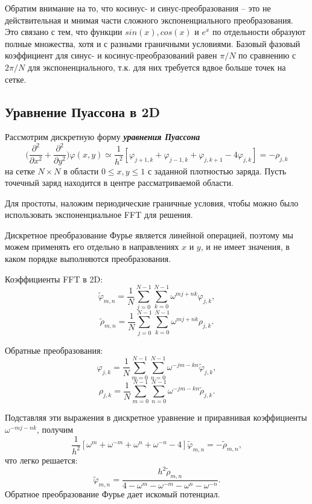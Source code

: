 \documentclass[a4paper,12pt]{article}
\theoremstyle{plain} %
\theoremstyle{definition} %
\theoremstyle{remark} %
\theoremstyle{definition}
\theoremstyle{definition}
\begin{document}
		Обратим внимание на то, что косинус- и синус-преобразования -- это не действительная и мнимая части сложного экспоненциального преобразования. Это связано с тем, что функции $sin(x), cos(x)$ и $e^{x}$ по отдельности образуют полные множества, хотя и с разными граничными условиями. Базовый фазовый коэффициент для синус- и косинус-преобразований равен $\pi/N$ по сравнению с $2\pi/N$ для экспоненциального, т.к. для них требуется вдвое больше точек на сетке.
		
	\subsection{Уравнение Пуассона в 2D}
		Рассмотрим дискретную форму \textrm{\textbf{\textit{уравнения Пуассона}}}
		$$\Big(\frac{\partial^{2}}{\partial x^{2}}+\frac{\partial^{2}}{\partial y^{2}}\Big)\varphi(x,y)\simeq\frac{1}{h^{2}}[\varphi_{j+1,k}+\varphi_{j-1,k}+\varphi_{j,k+1}-4\varphi_{j,k}]=-\rho_{j,k}$$
		на сетке $N\times N$ в области $0\le x,y\le 1$ с заданной плотностью заряда. Пусть точечный заряд находится в центре рассматриваемой области.
		\medskip
		
		Для простоты, наложим периодические граничные условия, чтобы можно было использовать экспоненциальное FFT для решения.
		\medskip
		
		Дискретное преобразование Фурье является линейной операцией, поэтому мы можем применять его отдельно в направлениях $x$ и $y$, и не имеет значения, в каком порядке выполняются преобразования.
		\medskip
		
		Коэффициенты FFT в 2D:
		$$\tilde{\varphi}_{m,n}=\frac{1}{N}\sum_{j=0}^{N-1}\sum_{k=0}^{N-1}\omega^{mj+nk}\varphi_{j,k},$$
		$$\tilde{\rho}_{m,n}=\frac{1}{N}\sum_{j=0}^{N-1}\sum_{k=0}^{N-1}\omega^{mj+nk}\rho_{j,k}.$$
		
		Обратные преобразования:
		$$\varphi_{j,k}=\frac{1}{N}\sum_{m=0}^{N-1}\sum_{n=0}^{N-1}\omega^{-jm-kn}\tilde{\varphi}_{j,k},$$
		$$\rho_{j,k}=\frac{1}{N}\sum_{m=0}^{N-1}\sum_{n=0}^{N-1}\omega^{-jm-kn}\tilde{\rho}_{j,k}.$$
		
		Подставляя эти выражения в дискретное уравнение и приравнивая коэффициенты $\omega^{-mj-nk}$, получим
		$$\frac{1}{h^{2}}[\omega^{m}+\omega^{-m}+\omega^{n}+\omega^{-n}-4]\tilde{\varphi}_{m,n}=-\tilde{\rho}_{m,n},$$
		что легко решается:
		$$\tilde{\varphi}_{m,n}=\frac{h^{2}\tilde{\rho}_{m,n}}{4-\omega^m-\omega^{-m}-\omega^{n}-\omega^{-n}}.$$ 
		\medskip
		Обратное преобразование Фурье дает искомый потенциал.
	
\end{document}

